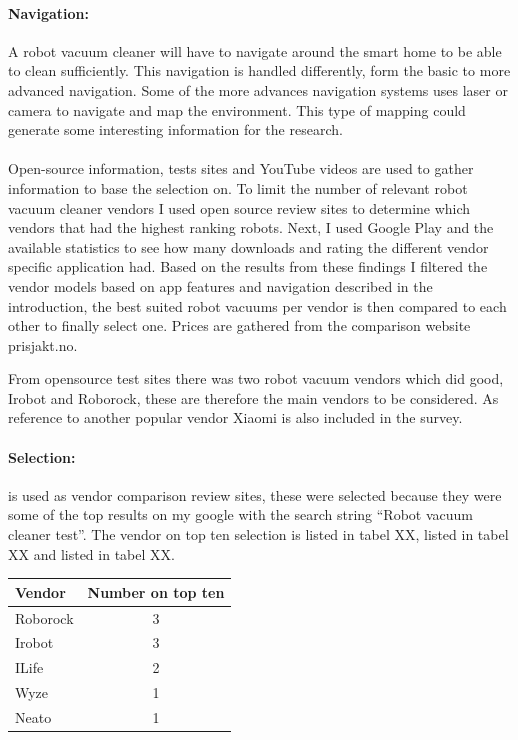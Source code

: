     \paragraph{Navigation:}A robot vacuum cleaner will have to navigate around the smart home to be able to clean sufficiently. This navigation is handled differently, form the basic to more advanced navigation. Some of the more advances navigation systems uses laser or camera to navigate and map the environment. \cite{robotsel5} \cite{robotsel6} This type of mapping could generate some interesting information for the research. 

\paragraph{}Open-source information, tests sites and YouTube videos are used to gather information to base the selection on. To limit the number of relevant robot vacuum cleaner vendors I used open source review sites to determine which vendors that had the highest ranking robots. Next, I used Google Play and the available statistics to see how many downloads and rating the different vendor specific application had. Based on the results from these findings I filtered the vendor models based on app features and navigation described in the introduction, the best suited robot vacuums per vendor is then compared to each other to finally select one. Prices are gathered from the comparison website prisjakt.no\cite{prisjakt.no}. 

 From opensource test sites there was two robot vacuum vendors which did good, Irobot and Roborock, these are therefore the main vendors to be considered. As reference to another popular vendor Xiaomi is also included in the survey.\cite{robotsel11}\cite{robotsel12}\cite{robotsel13}

\paragraph{Selection:} \cite{robotsel11}\cite{robotsel12}\cite{robotsel13} is used as vendor comparison review sites, these were selected because they were some of the top results on my google with the search string “Robot vacuum cleaner test”. The vendor on top ten selection \cite{robotsel11} is listed in tabel XX, \cite{robotsel12} listed in tabel XX and \cite{robotsel13} listed in tabel XX. 

\begin{table}[]
\begin{tabular}{|l|c|}
\hline
Vendor   & Number on top ten \\ \hline
Roborock & 3                 \\ \hline
Irobot   & 3                 \\ \hline
ILife    & 2                 \\ \hline
Wyze     & 1                 \\ \hline
Neato    & 1                 \\ \hline
\end{tabular}
\end{table}


